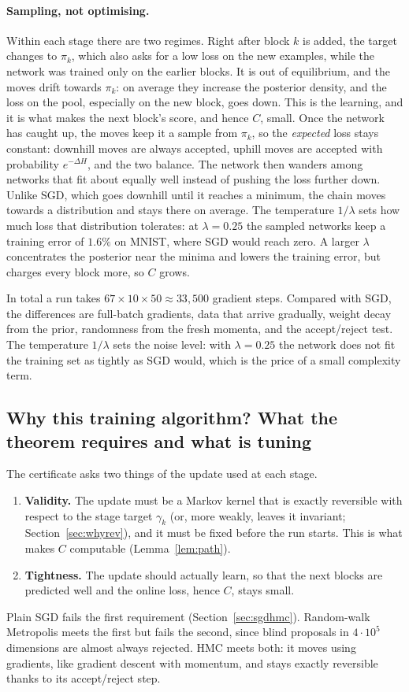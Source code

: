\documentclass[11pt]{article}
\theoremstyle{definition}
\theoremstyle{remark}
\begin{document}
\paragraph{Sampling, not optimising.} Within each stage there are two regimes. Right after block $k$ is added, the target
changes to $\pi_k$, which also asks for a low loss on the new examples, while the network was trained only on the earlier
blocks. It is out of equilibrium, and the moves drift towards $\pi_k$: on average they increase the posterior density, and
the loss on the pool, especially on the new block, goes down. This is the learning, and it is what makes the next block's
score, and hence $C$, small. Once the network has caught up, the moves keep it a sample from $\pi_k$, so the
\emph{expected} loss stays constant: downhill moves are always accepted, uphill moves are accepted with probability
$e^{-\Delta H}$, and the two balance. The network then wanders among networks that fit about equally well instead of pushing
the loss further down. Unlike SGD, which goes downhill until it reaches a minimum, the chain moves towards a
distribution and stays there on average. The temperature $1/\lambda$ sets how much loss that distribution tolerates: at
$\lambda=0.25$ the sampled networks keep a training error of $1.6\%$ on MNIST, where SGD would reach zero. A larger $\lambda$
concentrates the posterior near the minima and lowers the training error, but charges every block more, so $C$ grows.

In total a run takes $67\times10\times50\approx33{,}500$ gradient steps. Compared with SGD, the differences are full-batch
gradients, data that arrive gradually, weight decay from the prior, randomness from the fresh momenta, and the
accept/reject test. The temperature $1/\lambda$ sets the noise level: with $\lambda=0.25$ the network does not fit the
training set as tightly as SGD would, which is the price of a small complexity term.

\subsection{Why this training algorithm? What the theorem requires and what is tuning}\label{sec:design}
The certificate asks two things of the update used at each stage.
\begin{enumerate}[nosep]
\item \textbf{Validity.} The update must be a Markov kernel that is exactly reversible with respect to the stage target
  $\gamma_k$ (or, more weakly, leaves it invariant; Section~\ref{sec:whyrev}), and it must be fixed before the run starts.
  This is what makes $C$ computable (Lemma~\ref{lem:path}).
\item \textbf{Tightness.} The update should actually learn, so that the next blocks are predicted well and the online loss,
  hence $C$, stays small.
\end{enumerate}
Plain SGD fails the first requirement (Section~\ref{sec:sgdhmc}). Random-walk Metropolis meets the first but fails the
second, since blind proposals in $4\cdot10^5$ dimensions are almost always rejected. HMC meets both: it moves using
gradients, like gradient descent with momentum, and stays exactly reversible thanks to its accept/reject step.
\end{document}
